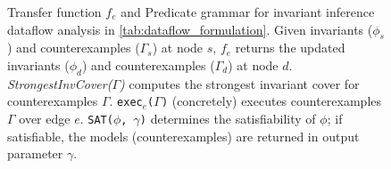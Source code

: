\begin{figure}[H]
\begin{center}
\begin{subfigure}[t]{.52\textwidth}
  \end{subfigure}%
  \caption{Transfer function $f_e$ and Predicate grammar for invariant inference dataflow analysis in \cref{tab:dataflow_formulation}.
  Given invariants ($\phi_{s}$) and counterexamples ($\Gamma_{s}$) at node $s$,
  $f_e$ returns the updated
  invariants ($\phi_{d}$) and counterexamples ($\Gamma_{d}$) at
  node $d$.
  {\em StrongestInvCover($\Gamma$)} computes the strongest invariant cover for counterexamples $\Gamma$.
  {\tt exec$_e$($\Gamma$)} (concretely) executes
  counterexamples $\Gamma$ over edge $e$.
  {\tt SAT($\phi$, $\gamma$)} determines
  the satisfiability of $\phi$; if satisfiable, the models (counterexamples) are returned in output parameter $\gamma$.}
  \end{center}
  \end{figure}
